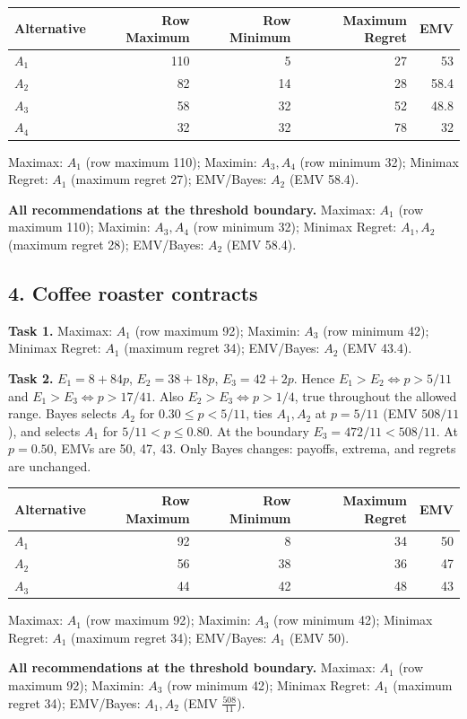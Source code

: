 \begin{center}\begin{tabular}{lrrrr}\toprule Alternative & Row Maximum & Row Minimum & Maximum Regret & EMV\\\midrule
$A_1$ & 110 & 5 & 27 & 53\\
$A_2$ & 82 & 14 & 28 & 58.4\\
$A_3$ & 58 & 32 & 52 & 48.8\\
$A_4$ & 32 & 32 & 78 & 32\\
\bottomrule\end{tabular}\end{center}
Maximax: $A_1$ (row maximum 110); Maximin: $A_3,A_4$ (row minimum 32); Minimax Regret: $A_1$ (maximum regret 27); EMV/Bayes: $A_2$ (EMV 58.4).

\textbf{All recommendations at the threshold boundary.} Maximax: $A_1$ (row maximum 110); Maximin: $A_3,A_4$ (row minimum 32); Minimax Regret: $A_1,A_2$ (maximum regret 28); EMV/Bayes: $A_2$ (EMV 58.4).
\subsection*{4. Coffee roaster contracts}
\textbf{Task 1.} Maximax: $A_1$ (row maximum 92); Maximin: $A_3$ (row minimum 42); Minimax Regret: $A_1$ (maximum regret 34); EMV/Bayes: $A_2$ (EMV 43.4).

\textbf{Task 2.} $E_1=8+84p$, $E_2=38+18p$, $E_3=42+2p$. Hence $E_1>E_2\iff p>5/11$ and $E_1>E_3\iff p>17/41$. Also $E_2>E_3\iff p>1/4$, true throughout the allowed range. Bayes selects $A_2$ for $0.30\leq p<5/11$, ties $A_1,A_2$ at $p=5/11$ (EMV $508/11$), and selects $A_1$ for $5/11<p\leq0.80$. At the boundary $E_3=472/11<508/11$. At $p=0.50$, EMVs are 50, 47, 43. Only Bayes changes: payoffs, extrema, and regrets are unchanged.

\begin{center}\begin{tabular}{lrrrr}\toprule Alternative & Row Maximum & Row Minimum & Maximum Regret & EMV\\\midrule
$A_1$ & 92 & 8 & 34 & 50\\
$A_2$ & 56 & 38 & 36 & 47\\
$A_3$ & 44 & 42 & 48 & 43\\
\bottomrule\end{tabular}\end{center}
Maximax: $A_1$ (row maximum 92); Maximin: $A_3$ (row minimum 42); Minimax Regret: $A_1$ (maximum regret 34); EMV/Bayes: $A_1$ (EMV 50).

\textbf{All recommendations at the threshold boundary.} Maximax: $A_1$ (row maximum 92); Maximin: $A_3$ (row minimum 42); Minimax Regret: $A_1$ (maximum regret 34); EMV/Bayes: $A_1,A_2$ (EMV $\frac{508}{11}$).
\newpage

